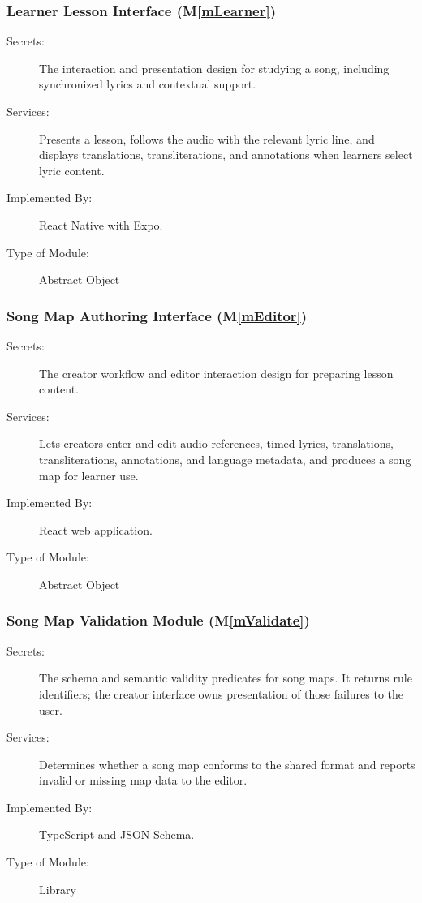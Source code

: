 \documentclass[12pt, titlepage]{article}
\newcommand{\mref}[1]{M\ref{#1}}
\begin{document}
\subsubsection{Learner Lesson Interface (\mref{mLearner})}

\begin{description}
\item[Secrets:] The interaction and presentation design for studying a song,
  including synchronized lyrics and contextual support.
\item[Services:] Presents a lesson, follows the audio with the relevant lyric
  line, and displays translations, transliterations, and annotations when
  learners select lyric content.
\item[Implemented By:] React Native with Expo.
\item[Type of Module:] Abstract Object
\end{description}

\subsubsection{Song Map Authoring Interface (\mref{mEditor})}

\begin{description}
\item[Secrets:] The creator workflow and editor interaction design for preparing
  lesson content.
\item[Services:] Lets creators enter and edit audio references, timed lyrics,
  translations, transliterations, annotations, and language metadata, and
  produces a song map for learner use.
\item[Implemented By:] React web application.
\item[Type of Module:] Abstract Object
\end{description}

\subsubsection{Song Map Validation Module (\mref{mValidate})}

\begin{description}
\item[Secrets:] The schema and semantic validity predicates for song maps.
  It returns rule identifiers; the creator interface owns presentation of
  those failures to the user.
\item[Services:] Determines whether a song map conforms to the shared format
  and reports invalid or missing map data to the editor.
\item[Implemented By:] TypeScript and JSON Schema.
\item[Type of Module:] Library
\end{description}
\end{document}
